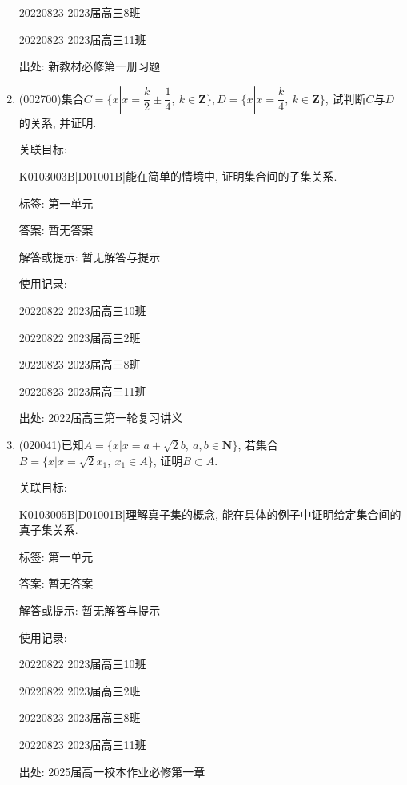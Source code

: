 \documentclass[10pt,a4paper]{article}
\begin{document}
\begin{enumerate}[1.]
20220823	2023届高三8班	

20220823	2023届高三11班	


出处: 新教材必修第一册习题
\item { (002700)}集合$C=\{x|x=\dfrac k2\pm \dfrac14, \ k\in \mathbf{Z}\},D=\{x|x=\dfrac k4,\ k\in \mathbf{Z}\}$, 试判断$C$与$D$的关系, 并证明.


关联目标:

K0103003B|D01001B|能在简单的情境中, 证明集合间的子集关系.



标签: 第一单元

答案: 暂无答案

解答或提示: 暂无解答与提示

使用记录:

20220822	2023届高三10班	

20220822	2023届高三2班	

20220823	2023届高三8班	

20220823	2023届高三11班	


出处: 2022届高三第一轮复习讲义
\item { (020041)}已知$A=\{x|x=a+\sqrt 2b,\ a,b\in \mathbf{N}\}$, 若集合$B=\{x|x=\sqrt 2x_1,\  x_1 \in A\}$, 证明$B\subset A$.


关联目标:

K0103005B|D01001B|理解真子集的概念, 能在具体的例子中证明给定集合间的真子集关系.



标签: 第一单元

答案: 暂无答案

解答或提示: 暂无解答与提示

使用记录:

20220822	2023届高三10班	

20220822	2023届高三2班	

20220823	2023届高三8班	

20220823	2023届高三11班	


出处: 2025届高一校本作业必修第一章
\end{enumerate}
\end{document}
